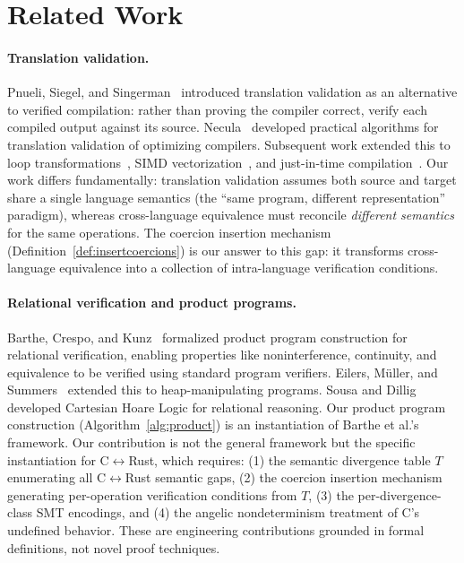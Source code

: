 \documentclass[11pt]{article}
\begin{document}
\section{Related Work}
\label{sec:related}

\paragraph{Translation validation.}
Pnueli, Siegel, and Singerman~\cite{pnueli1998} introduced translation validation as an alternative to verified compilation: rather than proving the compiler correct, verify each compiled output against its source. Necula~\cite{necula2000} developed practical algorithms for translation validation of optimizing compilers. Subsequent work extended this to loop transformations~\cite{zuck2003}, SIMD vectorization~\cite{tate2009}, and just-in-time compilation~\cite{myreen2009}. Our work differs fundamentally: translation validation assumes both source and target share a single language semantics (the ``same program, different representation'' paradigm), whereas cross-language equivalence must reconcile \emph{different semantics} for the same operations. The coercion insertion mechanism (Definition~\ref{def:insertcoercions}) is our answer to this gap: it transforms cross-language equivalence into a collection of intra-language verification conditions.

\paragraph{Relational verification and product programs.}
Barthe, Crespo, and Kunz~\cite{barthe2011} formalized product program construction for relational verification, enabling properties like noninterference, continuity, and equivalence to be verified using standard program verifiers. Eilers, M\"uller, and Summers~\cite{eilers2018} extended this to heap-manipulating programs. Sousa and Dillig~\cite{sousa2016} developed Cartesian Hoare Logic for relational reasoning. Our product program construction (Algorithm~\ref{alg:product}) is an instantiation of Barthe et al.'s framework. Our contribution is not the general framework but the specific instantiation for C$\leftrightarrow$Rust, which requires: (1) the semantic divergence table $T$ enumerating all C$\leftrightarrow$Rust semantic gaps, (2) the coercion insertion mechanism generating per-operation verification conditions from $T$, (3) the per-divergence-class SMT encodings, and (4) the angelic nondeterminism treatment of C's undefined behavior. These are engineering contributions grounded in formal definitions, not novel proof techniques.
\end{document}
